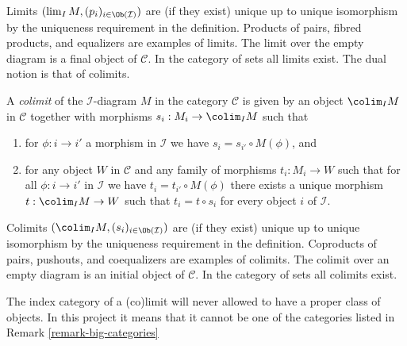\noindent
Limits $(\lim_I M, (p_i)_{i\in \Ob(\mathcal{I})})$ are
(if they exist)
unique up to unique isomorphism by the uniqueness requirement
in the definition. Products of pairs, fibred products, and equalizers are
examples of limits. The limit over the empty diagram is a final object
of $\mathcal{C}$.
In the category of sets all limits exist.
The dual notion is that of colimits.

\begin{definition}
\label{definition-colimit}
A {\it colimit} of the $\mathcal{I}$-diagram $M$ in the category
$\mathcal{C}$ is given by an object $\colim_I M$ in $\mathcal{C}$
together with morphisms $s_i : M_i \to \colim_I M$ such that
\begin{enumerate}
\item for $\phi : i \to i'$ a morphism
in $\mathcal{I}$ we have $s_i = s_{i'} \circ M(\phi)$, and
\item for any object $W$ in $\mathcal{C}$ and any family of
morphisms $t_i : M_i \to W$ such that for all $\phi : i \to i'$
in $\mathcal{I}$ we have $t_i = t_{i'} \circ M(\phi)$ there
exists a unique morphism $t : \colim_I M \to W$ such that
$t_i = t \circ s_i$ for every object $i$ of $\mathcal{I}$.
\end{enumerate}
\end{definition}

\noindent
Colimits $(\colim_I M, (s_i)_{i\in \Ob(\mathcal{I})})$ are
(if they exist) unique up to unique isomorphism by the uniqueness requirement
in the definition. Coproducts of pairs, pushouts, and coequalizers are
examples of colimits. The colimit over an empty diagram is an initial object
of $\mathcal{C}$. In the category of sets all colimits exist.

\begin{remark}
\label{remark-diagram-small}
The index category of a (co)limit will never allowed to have
a proper class of objects. In this project it means that
it cannot be one of the categories listed in
Remark \ref{remark-big-categories}
\end{remark}

